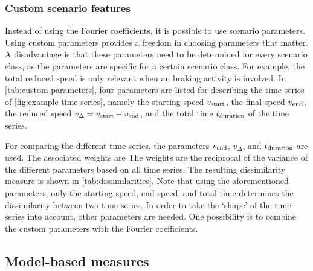\documentclass[10pt,final,a4paper,oneside,onecolumn]{article}
\newcommand{\parvstart}{v_{\textup{start}}}
\newcommand{\parvend}{v_{\textup{end}}}
\newcommand{\pardv}{v_{\Delta}}
\newcommand{\pardt}{t_{\textup{duration}}}
\theoremstyle{plain}\newtheorem{definition}{Definition}[section]    %
\theoremstyle{definition}\newtheorem{example}{Example}[section]     %
\theoremstyle{remark}\newtheorem{remarkenv}{Remark}[section]        %
\begin{document}
\begin{table}
	\centering
	\caption{Dissimilarity measures, according to \cref{eq:eucl features}, with Fourier coefficients (see \cref{sec:fourier coefficient}), custom scenario features (see \cref{sec:custom features}), parameters of an auto-regression model fit (see \cref{sec:auto regression models}), and splines parameters (see \cref{sec:spline models}).}
	\label{tab:dissimilarities}
	
\end{table}


\subsubsection{Custom scenario features}
\label{sec:custom features}

Instead of using the Fourier coefficients, it is possible to use scenario parameters. Using custom parameters provides a freedom in choosing parameters that matter. A disadvantage is that these parameters need to be determined for every scenario class, as the parameters are specific for a certain scenario class. For example, the total reduced speed is only relevant when an braking activity is involved. In \cref{tab:custom parameters}, four parameters are listed for describing the time series of \cref{fig:example time series}, namely the starting speed $\parvstart$, the final speed $\parvend$, the reduced speed $\pardv=\parvstart-\parvend$, and the total time $\pardt$ of the time series.

\begin{table}
	\centering
	\caption{Custom parameters for describing the time series of \cref{fig:example time series}.}
	\label{tab:custom parameters}
	
\end{table}

For comparing the different time series, the parameters $\parvend$, $\pardv$, and $\pardt$ are used. The associated weights are 
The weights are the reciprocal of the variance of the different parameters based on all time series. The resulting dissimilarity measure is shown in \cref{tab:dissimilarities}. Note that using the aforementioned parameters, only the starting speed, end speed, and total time determines the dissimilarity between two time series. In order to take the `shape' of the time series into account, other parameters are needed. One possibility is to combine the custom parameters with the Fourier coefficients. 


\subsection{Model-based measures}
\label{sec:model based}
\end{document}
